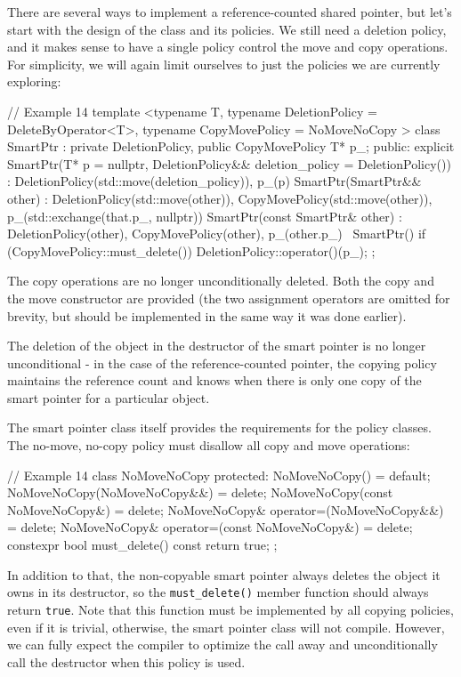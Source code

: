 There are several ways to implement a reference-counted shared pointer, but let's start with the design of the class and its policies. We still need a deletion policy, and it makes sense to have a single policy control the move and copy operations. For simplicity, we will again limit ourselves to just the policies we are currently exploring:

\begin{code}
// Example 14
template <typename T,
  typename DeletionPolicy = DeleteByOperator<T>,
  typename CopyMovePolicy = NoMoveNoCopy
>
class SmartPtr : private DeletionPolicy,
                 public CopyMovePolicy {
  T* p_;
  public:
  explicit SmartPtr(T* p = nullptr,
    DeletionPolicy&& deletion_policy = DeletionPolicy())
    : DeletionPolicy(std::move(deletion_policy)), p_(p)
  {}
  SmartPtr(SmartPtr&& other) :
    DeletionPolicy(std::move(other)),
    CopyMovePolicy(std::move(other)),
    p_(std::exchange(that.p_, nullptr)) {}
  SmartPtr(const SmartPtr& other) :
    DeletionPolicy(other),
    CopyMovePolicy(other),
    p_(other.p_) {}
  ~SmartPtr() {
    if (CopyMovePolicy::must_delete())
      DeletionPolicy::operator()(p_);
  }
};
\end{code}

The copy operations are no longer unconditionally deleted. Both the copy and the move constructor are provided (the two assignment operators are omitted for brevity, but should be implemented in the same way it was done earlier).

The deletion of the object in the destructor of the smart pointer is no longer unconditional - in the case of the reference-counted pointer, the copying policy maintains the reference count and knows when there is only one copy of the smart pointer for a particular object.

The smart pointer class itself provides the requirements for the policy classes. The no-move, no-copy policy must disallow all copy and move operations:

\begin{code}
// Example 14
class NoMoveNoCopy {
  protected:
  NoMoveNoCopy() = default;
  NoMoveNoCopy(NoMoveNoCopy&&) = delete;
  NoMoveNoCopy(const NoMoveNoCopy&) = delete;
  NoMoveNoCopy& operator=(NoMoveNoCopy&&) = delete;
  NoMoveNoCopy& operator=(const NoMoveNoCopy&) = delete;
  constexpr bool must_delete() const { return true; }
};
\end{code}

In addition to that, the non-copyable smart pointer always deletes the object it owns in its destructor, so the \texttt{must\_delete()} member function should always return \texttt{true}. Note that this function must be implemented by all copying policies, even if it is trivial, otherwise, the smart pointer class will not compile. However, we can fully expect the compiler to optimize the call away and unconditionally call the destructor when this policy is used.

